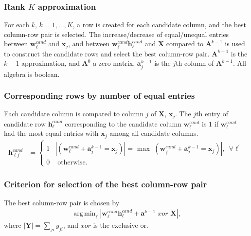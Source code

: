 \documentclass[12pt]{article}
\DeclareMathOperator*{\argmin}{arg\,min}
\begin{document}
\subsubsection*{Rank $K$ approximation} %

For each $k$, $k = 1, \ldots, K$, a row is created for each candidate column, and the best column-row pair is selected.
The increase/decrease of equal/unequal entries between $\mathbf{w}^{cand}_{\ell}$ and  $\mathbf{x}_j$, and between $\mathbf{w}^{cand}_{\ell} \mathbf{h}^{cand}_{\ell}$ and $\mathbf{X}$ compared to $\mathbf{A}^{k-1}$ is used to construct the candidate rows and select the best column-row pair. 
$\mathbf{A}^{k-1}$ is the $k-1$ approximation, and $\mathbf{A}^{0}$ a zero matrix, $\mathbf{a}^{k-1}_j$ is the $j$th column of $\mathbf{A}^{k-1}$.
All algebra is boolean. 

\subsubsection*{Corresponding rows by number of equal entries} %

Each candidate column is compared to column $j$ of $\mathbf{X}$,  $\mathbf{x}_j$.
The $j$th entry of candidate row $\mathbf{h}^{cand}_{\ell}$ corresponding to the candidate column $\mathbf{w}^{cand}_{\ell}$ is $1$ if $\mathbf{w}^{cand}_{\ell}$ had the most equal entries with  $\mathbf{x}_j $ among all candidate columns. 
\begin{align} \label{eq:Rows}
  \mathbf{h}^{cand}_{\ell j} & =
   \begin{cases}
   1 & | (\mathbf{w}^{cand}_{\ell} + \mathbf{a}^{k-1}_j = \mathbf{x}_j)| = \text{ max } |( \mathbf{w}^{cand}_{\ell^\prime}+ \mathbf{a}^{k-1}_j = \mathbf{x}_j)| , \, \, \,  \forall \ell^\prime \\
   0 & \text{ otherwise.}
  \end{cases}
\end{align}

\subsubsection*{Criterion for selection of the best column-row pair} %

The best column-row pair is chosen by 
\begin{align}
 \argmin_\ell |\mathbf{w}^{cand}_{\ell} \mathbf{h}^{cand}_{\ell} + \mathbf{a}^{k-1}\, \,  xor \, \,   \mathbf{X}|,
\end{align}
where $|\mathbf{Y}| = \sum_{j i} y_{ji}$, and $xor$ is the exclusive or.
\end{document}
